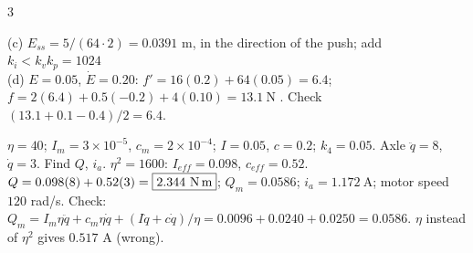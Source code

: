 \begin{multicols}{3}
\begin{examq}
(c) $E_{ss}=5/(64\cdot2)=0.0391$ m, in the direction of the push; add $k_i<k_vk_p=1024$ \\
(d) $E{=}0.05$, $\dot E{=}0.20$: $f'=16(0.2)+64(0.05)=6.4$; $f=2(6.4)+0.5(-0.2)+4(0.10)=\boxed{13.1\ \text{N}}$ . Check $(13.1+0.1-0.4)/2=6.4$. \chk
\end{examq}
\begin{examq}
$\eta{=}40$; $I_m{=}3{\times}10^{-5}$, $c_m{=}2{\times}10^{-4}$; $I{=}0.05$, $c{=}0.2$; $k_4{=}0.05$. Axle $\ddot q{=}8$, $\dot q{=}3$. Find $Q$, $i_a$.
\solution
$\eta^2=1600$: $I_{eff}=0.098$, $c_{eff}=0.52$. $Q=0.098(8)+0.52(3)=\boxed{2.344\ \text{N\,m}}$; $Q_m=0.0586$; $i_a=\boxed{1.172\ \text{A}}$; motor speed $120$ rad/s. Check: $Q_m=I_m\eta\ddot q+c_m\eta\dot q+(I\ddot q+c\dot q)/\eta=0.0096+0.0240+0.0250=0.0586$. $\eta$ instead of $\eta^2$ gives $0.517$ A (wrong). \chk
\end{examq}
\end{multicols}
